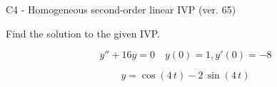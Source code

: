 \begin{exercise}
  \begin{exerciseTitle}C4 - Homogeneous second-order linear IVP (ver. 65)\end{exerciseTitle}
  \begin{exerciseStatement}
    
Find the solution to the given IVP.

    
\[y''+16y = 0 \hspace{1em} y(0) = 1 , y'(0) = -8\]

  \end{exerciseStatement}
  \begin{exerciseAnswer}
    
\[y= \cos\left(4 \, t\right) - 2 \, \sin\left(4 \, t\right)\]

  \end{exerciseAnswer}
\end{exercise}